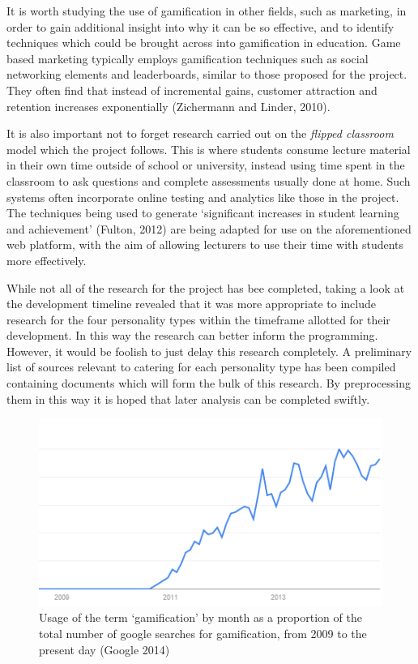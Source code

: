 \documentclass[10pt,a4paper]{report}
\begin{document}
It is worth studying the use of gamification in other fields, such as marketing, in order to gain additional insight into why it can be so effective, and to identify techniques which could be brought across into gamification in education. Game based marketing typically employs gamification techniques such as social networking elements and leaderboards, similar to those proposed for the project. They often find that instead of incremental gains, customer attraction and retention increases exponentially (Zichermann and Linder, 2010). 

It is also important not to forget research carried out on the \textit{flipped classroom} model which the project follows. This is where students consume lecture material in their own time outside of school or university, instead using time spent in the classroom to ask questions and complete assessments usually done at home. Such systems often incorporate online testing and analytics like those in the project. The techniques being used to generate `significant increases in student learning and achievement' (Fulton, 2012) are being adapted for use on the aforementioned web platform, with the aim of allowing lecturers to use their time with students more effectively.

While not all of the research for the project has bee completed, taking a look at the development timeline revealed that it was more appropriate to include research for the four personality types within the timeframe allotted for their development. In this way the research can better inform the programming. However, it would be foolish to just delay this research completely. A preliminary list of sources relevant to catering for each personality type has been compiled containing documents which will form the bulk of this research. By preprocessing them in this way it is hoped that later analysis can be completed swiftly.

\begin{figure}
	\includegraphics{../img/usage-graph.png}
	\caption{Usage of the term `gamification' by month as a proportion of the total number of google searches for gamification, from 2009 to the present day (Google 2014)}
	\label{usage}
\end{figure}
\end{document}
